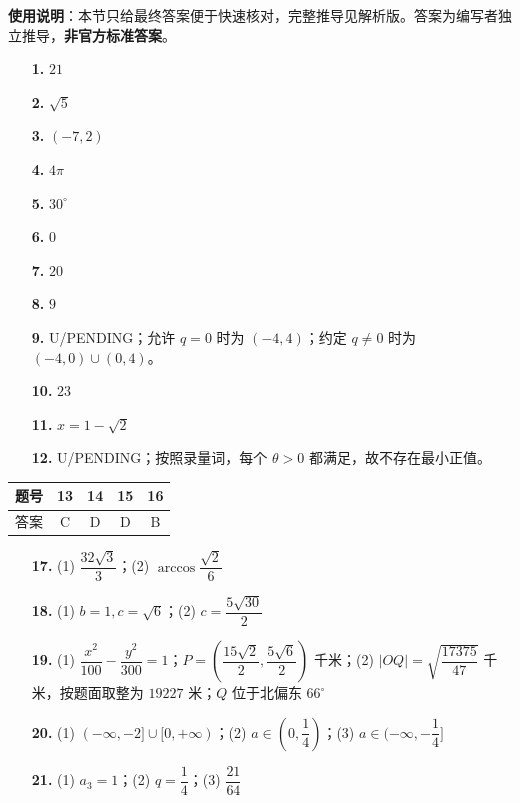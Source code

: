 
\begin{gknotice}
\textbf{使用说明}：本节只给最终答案便于快速核对，完整推导见解析版。答案为编写者独立推导，\textbf{非官方标准答案}。
\end{gknotice}

\begin{itemize}[leftmargin=2.6em]
  \item[\textbf{1.}] $21$
  \item[\textbf{2.}] $\sqrt5$
  \item[\textbf{3.}] $(-7,2)$
  \item[\textbf{4.}] $4\pi$
  \item[\textbf{5.}] $30^\circ$
  \item[\textbf{6.}] $0$
  \item[\textbf{7.}] $20$
  \item[\textbf{8.}] $9$
  \item[\textbf{9.}] U/PENDING；允许 $q=0$ 时为 $(-4,4)$；约定 $q\ne0$ 时为 $(-4,0)\cup(0,4)$。
  \item[\textbf{10.}] $23$
  \item[\textbf{11.}] $x=1-\sqrt2$
  \item[\textbf{12.}] U/PENDING；按照录量词，每个 $\theta>0$ 都满足，故不存在最小正值。
\end{itemize}

\begin{center}\begin{tabular}{ccccc}
\toprule
题号 & 13 & 14 & 15 & 16 \\
\midrule
答案 & C & D & D & B \\
\bottomrule
\end{tabular}\end{center}

\begin{itemize}[leftmargin=2.6em]
  \item[\textbf{17.}] (1) $\dfrac{32\sqrt3}{3}$；(2) $\arccos\dfrac{\sqrt2}{6}$
  \item[\textbf{18.}] (1) $b=1,c=\sqrt6$；(2) $c=\dfrac{5\sqrt{30}}2$
  \item[\textbf{19.}] (1) $\dfrac{x^2}{100}-\dfrac{y^2}{300}=1$；$P=(\dfrac{15\sqrt2}{2},\dfrac{5\sqrt6}{2})$ 千米；(2) $|OQ|=\sqrt{\dfrac{17375}{47}}$ 千米，按题面取整为 $19227$ 米；$Q$ 位于北偏东 $66^\circ$
  \item[\textbf{20.}] (1) $(-\infty,-2]\cup[0,+\infty)$；(2) $a\in(0,\dfrac14)$；(3) $a\in(-\infty,-\dfrac14]$
  \item[\textbf{21.}] (1) $a_3=1$；(2) $q=\dfrac14$；(3) $\dfrac{21}{64}$
\end{itemize}
